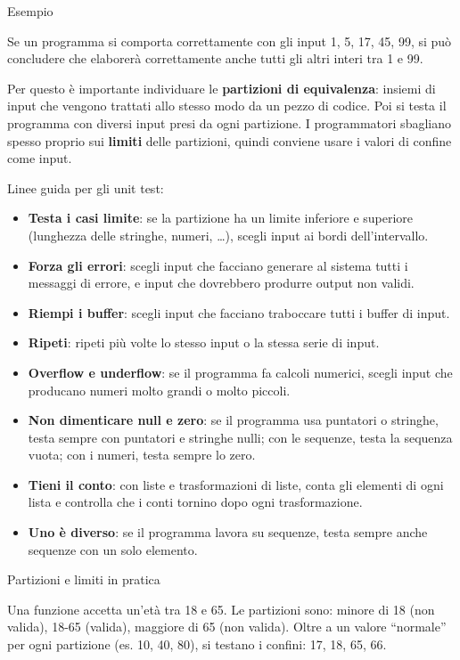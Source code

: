 \begin{boxexample}{Esempio}

Se un programma si comporta correttamente con gli input 1, 5, 17, 45,
99, si può concludere che elaborerà correttamente anche tutti gli altri
interi tra 1 e 99.

\end{boxexample}

Per questo è importante individuare le \textbf{partizioni di
equivalenza}: insiemi di input che vengono trattati allo stesso modo da
un pezzo di codice. Poi si testa il programma con diversi input presi da
ogni partizione. I programmatori sbagliano spesso proprio sui
\textbf{limiti} delle partizioni, quindi conviene usare i valori di
confine come input.

Linee guida per gli unit test:

\begin{itemize}
\tightlist
\item
  \textbf{Testa i casi limite}: se la partizione ha un limite inferiore
  e superiore (lunghezza delle stringhe, numeri, \ldots), scegli input
  ai bordi dell'intervallo.
\item
  \textbf{Forza gli errori}: scegli input che facciano generare al
  sistema tutti i messaggi di errore, e input che dovrebbero produrre
  output non validi.
\item
  \textbf{Riempi i buffer}: scegli input che facciano traboccare tutti i
  buffer di input.
\item
  \textbf{Ripeti}: ripeti più volte lo stesso input o la stessa serie di
  input.
\item
  \textbf{Overflow e underflow}: se il programma fa calcoli numerici,
  scegli input che producano numeri molto grandi o molto piccoli.
\item
  \textbf{Non dimenticare null e zero}: se il programma usa puntatori o
  stringhe, testa sempre con puntatori e stringhe nulli; con le
  sequenze, testa la sequenza vuota; con i numeri, testa sempre lo zero.
\item
  \textbf{Tieni il conto}: con liste e trasformazioni di liste, conta
  gli elementi di ogni lista e controlla che i conti tornino dopo ogni
  trasformazione.
\item
  \textbf{Uno è diverso}: se il programma lavora su sequenze, testa
  sempre anche sequenze con un solo elemento.
\end{itemize}

\begin{boxexample}{Partizioni e limiti in pratica}

Una funzione accetta un'età tra 18 e 65. Le partizioni sono: minore di
18 (non valida), 18-65 (valida), maggiore di 65 (non valida). Oltre a un
valore ``normale'' per ogni partizione (es. 10, 40, 80), si testano i
confini: 17, 18, 65, 66.

\end{boxexample}

